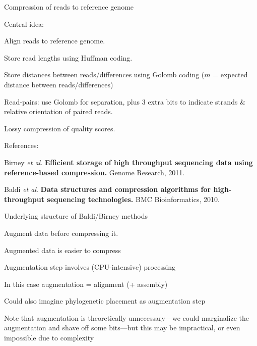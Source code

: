 \documentclass{beamer}
\begin{document}
\begin{frame}{Compression of reads to reference genome}

\itemb
\item Central idea:
 \itemb
 \item \alert{Align reads to reference genome.}
 \item Store read lengths using \alert{Huffman coding.}
 \item Store distances between reads/differences using \alert{Golomb coding} ($m$ = expected distance between reads/differences)
 \item Read-pairs: use Golomb for separation, plus 3 extra bits to indicate strands \& relative orientation of paired reads.
 \item \alert{Lossy compression} of quality scores.
 \iteme
\item References:
\itemb
\item Birney {\em et al}.
{\bf Efficient storage of high throughput sequencing data using reference-based compression.}
Genome Research, 2011.
\item Baldi {\em et al}.
{\bf Data structures and compression algorithms for high-throughput sequencing technologies.}
BMC Bioinformatics, 2010.
\iteme
\iteme

\end{frame}


\begin{frame}{Underlying structure of Baldi/Birney methods}

\itemb
\item \alert{Augment} data before \alert{compressing} it.
\itemb
 \item Augmented data is easier to compress
 \item Augmentation step involves (CPU-intensive) processing
 \item In this case augmentation = alignment (+ assembly)
 \item Could also imagine \alert{phylogenetic placement} as augmentation step
\iteme
\item Note that augmentation is theoretically unnecessary---we could marginalize the augmentation and shave off some bits---but this may be impractical, or even impossible due to complexity
\iteme

\end{frame}
\end{document}
